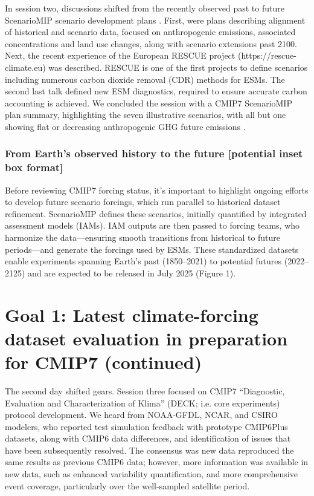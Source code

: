 \documentclass{ametsocV6.1}
\begin{document}
In session two, discussions shifted from the recently observed past to future ScenarioMIP scenario development plans \citep{van_vuuren_scenario_2025}. First, were plans describing alignment of historical and scenario data, focused on anthropogenic emissions, associated concentrations and land use changes, along with scenario extensions past 2100. Next, the recent experience of the European RESCUE project (https://rescue-climate.eu) was described. RESCUE is one of the first projects to define scenarios including numerous carbon dioxide removal (CDR) methods for ESMs. The second last talk defined new ESM diagnostics, required to ensure accurate carbon accounting is achieved. We concluded the session with a CMIP7 ScenarioMIP plan summary, highlighting the seven illustrative scenarios, with all but one showing flat or decreasing anthropogenic GHG future emissions \citep{van_vuuren_scenario_2025}.

\subsubsection*{From Earth’s observed history to the future [potential inset box format]}
Before reviewing CMIP7 forcing status, it's important to highlight ongoing efforts to develop future scenario forcings, which run parallel to historical dataset refinement. ScenarioMIP \citep{van_vuuren_scenario_2025} defines these scenarios, initially quantified by integrated assessment models (IAMs). IAM outputs are then passed to forcing teams, who harmonize the data—ensuring smooth transitions from historical to future periods—and generate the forcings used by ESMs. These standardized datasets enable experiments spanning Earth’s past (1850–2021) to potential futures (2022–2125) and are expected to be released in July 2025 (Figure 1).

\section*{Goal 1: Latest climate-forcing dataset evaluation in preparation for CMIP7 (continued)}
The second day shifted gears. Session three focused on CMIP7 ``Diagnostic, Evaluation and Characterization of Klima'' (DECK; i.e. core experiments) protocol development. We heard from NOAA-GFDL, NCAR, and CSIRO modelers, who reported test simulation feedback with prototype CMIP6Plus datasets, along with CMIP6 data differences, and identification of issues that have been subsequently resolved. The consensus was new data reproduced the same results as previous CMIP6 data; however, more information was available in new data, such as enhanced variability quantification, and more comprehensive event coverage, particularly over the well-sampled satellite period.
\end{document}
